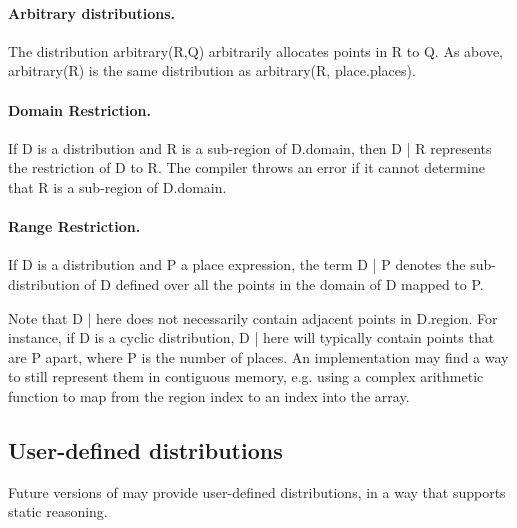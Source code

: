 \paragraph{Arbitrary distributions.} 
The distribution {\cf arbitrary(R,Q)} arbitrarily allocates points in {\cf
R} to {\cf Q}. As above, {\cf arbitrary(R)} is the same distribution as
{\cf arbitrary(R, place.places)}.


\paragraph{Domain Restriction.} 

If {\cf D} is a distribution and {\cf R} is a sub-region of {\cf
D.domain}, then {\cf D | R} represents the restriction of {\cf D} to
{\cf R}.  The compiler throws an error if it cannot determine that
{\cf R} is a sub-region of {\cf D.domain}.

\paragraph{Range Restriction.}

If {\cf D} is a distribution and {\cf P} a place expression, the term
{\cf D | P} denotes the sub-distribution of {\cf D} defined over all the
points in the domain of {\cf D} mapped to {\cf P}.

\cbstart
Note that {\cf D | here} does not necessarily contain adjacent points
in {\cf D.region}. For instance, if {\cf D} is a cyclic distribution,
{\cf D | here} will typically contain points that are {\cf P} apart,
where {\cf P} is the number of places. An implementation may find a
way to still represent them in contiguous memory, e.g.{} using a
complex arithmetic function to map from the region index to an index
into the array.
\cbend

\subsection{User-defined distributions}

Future versions of \Xten{} may provide user-defined distributions, in
a way that supports static reasoning.


